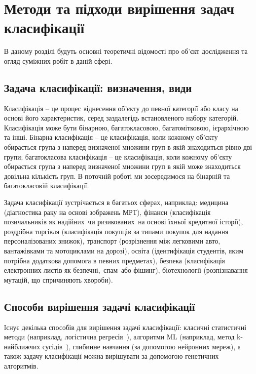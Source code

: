 
\chapter{Методи та підходи вирішення задач класифікації}
\label{chap:review}  %

В даному розділі будуть основні теоретичні відомості про об'єкт дослідження та огляд суміжних робіт в даній сфері.

\section{Задача класифікації: визначення, види}

Класифікація -- це процес віднесення об'єкту до певної категорії або класу на основі його характеристик, серед заздалегідь встановленого набору категорій. Класифікація може бути бінарною, багатокласовою, багатомітковою, ієрархічною та інші. Бінарна класифікація -- це класифікація, коли кожному об'єкту обирається група з наперед визначеної множини груп в якій знаходиться рівно дві групи; багатокласова класифікація -- це класифікація, коли кожному об'єкту обирається група з наперед визначеної множини груп в якій може знаходиться довільна кількість груп. В поточній роботі ми зосередимося на бінарній та багатокласовій класифікації.

Задача класифікації зустрічається в багатьох сферах, наприклад: медицина (діагностика раку на основі зображень МРТ), фінанси (класифікація позичальників як \glqq надійних\grqq\ чи \glqq ризикованих\grqq\ на основі їхньої кредитної історії), роздрібна торгівля (класифікація покупців за типами покупок для надання персоналізованих знижок), транспорт (розрізнення між легковими авто, вантажівками та мотоциклами на дорозі), освіта (ідентифікація студентів, яким потрібна додаткова допомога в певних предметах), безпека (класифікація електронних листів як \glqq безпечні,\grqq\ \glqq спам\grqq\ або \glqq фішинг\grqq), біотехнології (розпізнавання мутацій, що спричиняють хвороби). 

\section{Способи вирішення задачі класифікації}\label{sec:methods_of_solving_the_classification_problem}

Існує декілька способів для вирішення задачі класифікації: класичні статистичні методи (наприклад, логістична регресія~\cite{ct1}), алгоритми ML (наприклад, метод k-найближчих сусідів~\cite{ct4}), глибинне навчання (за допомогою нейронних мереж), а також задачу класифікації можна вирішувати за допомогою генетичних алгоритмів.

